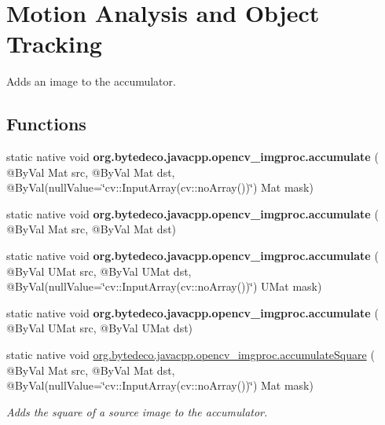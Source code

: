 \hypertarget{group__imgproc__motion}{}\section{Motion Analysis and Object Tracking}
\label{group__imgproc__motion}


Adds an image to the accumulator.  


\subsection*{Functions}
\begin{DoxyCompactItemize}
\item 
\mbox{\label{group__imgproc__motion_gaec1fb467f4be36738a26a3497031e950}} 
static native void {\bfseries org.\+bytedeco.\+javacpp.\+opencv\+\_\+imgproc.\+accumulate} ( @By\+Val Mat src, @By\+Val Mat dst, @By\+Val(null\+Value=\char`\"{}cv\+::\+Input\+Array(cv\+::no\+Array())\char`\"{}) Mat mask)
\item 
\mbox{\label{group__imgproc__motion_ga965a876013ca2a1fa8f400e712a3bc4e}} 
static native void {\bfseries org.\+bytedeco.\+javacpp.\+opencv\+\_\+imgproc.\+accumulate} ( @By\+Val Mat src, @By\+Val Mat dst)
\item 
\mbox{\label{group__imgproc__motion_ga8146859d223ed1d19f686efa9108377f}} 
static native void {\bfseries org.\+bytedeco.\+javacpp.\+opencv\+\_\+imgproc.\+accumulate} ( @By\+Val U\+Mat src, @By\+Val U\+Mat dst, @By\+Val(null\+Value=\char`\"{}cv\+::\+Input\+Array(cv\+::no\+Array())\char`\"{}) U\+Mat mask)
\item 
\mbox{\label{group__imgproc__motion_gab54cd5c7811187acb40a87524be3bb2b}} 
static native void {\bfseries org.\+bytedeco.\+javacpp.\+opencv\+\_\+imgproc.\+accumulate} ( @By\+Val U\+Mat src, @By\+Val U\+Mat dst)
\item 
static native void \hyperlink{group__imgproc__motion_ga84b3439df65475bcccdee5cd99171da8}{org.\+bytedeco.\+javacpp.\+opencv\+\_\+imgproc.\+accumulate\+Square} ( @By\+Val Mat src, @By\+Val Mat dst, @By\+Val(null\+Value=\char`\"{}cv\+::\+Input\+Array(cv\+::no\+Array())\char`\"{}) Mat mask)
\begin{DoxyCompactList}\small\item\em Adds the square of a source image to the accumulator. \end{DoxyCompactList}\item 

\end{DoxyCompactItemize}
